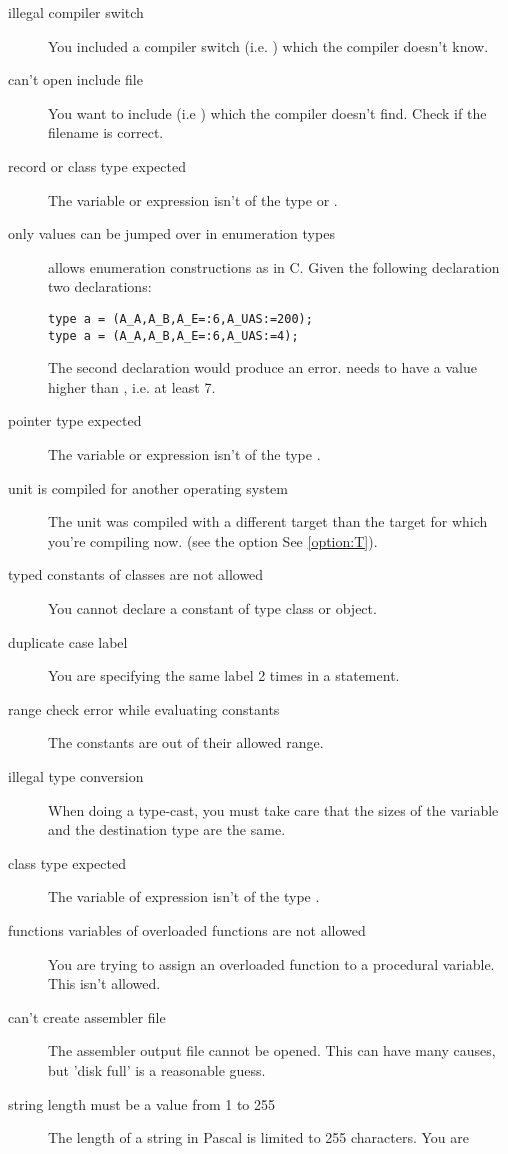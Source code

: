 \documentclass{report}
\newcommand{\seeo}[1]{See \ref{option:#1}}
\begin{document}
\begin{description}
\item [illegal compiler switch]
You included a compiler switch (i.e. ) which the compiler
doesn't know.
\item [can't open include file]
You want to include (i.e ) which the compiler doesn't
find. Check if the filename is correct.
\item [record or class type expected]
The variable or expression isn't of the type  or .
\item [only values can be jumped over in enumeration types]
\fpc allows enumeration constructions as in C. Given the following
declaration two declarations:
\begin{verbatim}
type a = (A_A,A_B,A_E=:6,A_UAS:=200);
type a = (A_A,A_B,A_E=:6,A_UAS:=4);
\end{verbatim}
The second declaration would produce an error.  needs to have a
value higher than , i.e. at least 7.
\item [pointer type expected]
The variable or expression isn't of the type .
\item [unit is compiled for another operating system]
The unit was compiled with a different target than the target for which
you're compiling now. (see the option  \seeo{T}).
\item [typed constants of classes are not allowed]
You cannot declare a constant of type class or object.
\item [duplicate case label]
You are specifying the same label 2 times in a  statement.
\item [range check error while evaluating constants]
The constants are out of their allowed range.
\item [illegal type conversion]
When doing a type-cast, you must take care that the sizes of the variable and
the destination type are the same. 
\item [class type expected]
The variable of expression isn't of the type .
\item [functions variables of overloaded functions are not allowed]
You are trying to assign an overloaded function to a procedural variable.
This isn't allowed.
\item [can't create assembler file]
The assembler output file cannot be opened. This can have many causes, but
'disk full' is a reasonable guess.
\item [string length must be a value from 1 to 255]
The length of a string in Pascal is limited to 255 characters. You are

\end{description}
\end{document}
